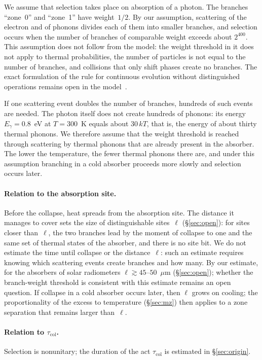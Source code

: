 \documentclass[11pt,a4paper]{article}
\newcommand{\Sref}[1]{\hyperref[#1]{\S\ref{#1}}}
\begin{document}
We assume that selection takes place on absorption of a photon. The branches ``zone~0'' and ``zone~1'' have weight~$1/2$. By our assumption, scattering of the electron and of phonons divides each of them into smaller branches, and selection occurs when the number of branches of comparable weight exceeds about $2^{400}$. This assumption does not follow from the model: the weight threshold in it does not apply to thermal probabilities, the number of particles is not equal to the number of branches, and collisions that only shift phases create no branches. The exact formulation of the rule for continuous evolution without distinguished operations remains open in the model~\cite{ponfilenok2026threshold}.

If one scattering event doubles the number of branches, hundreds of such events are needed. The photon itself does not create hundreds of phonons: its energy $E_\gamma=0.8$~eV at $T=300$~K equals about $30\,kT$, that is, the energy of about thirty thermal phonons. We therefore assume that the weight threshold is reached through scattering by thermal phonons that are already present in the absorber. The lower the temperature, the fewer thermal phonons there are, and under this assumption branching in a cold absorber proceeds more slowly and selection occurs later.

\paragraph{Relation to the absorption site.}
Before the collapse, heat spreads from the absorption site. The distance it manages to cover sets the size of distinguishable sites~$\ell$ (\Sref{sec:open}): for sites closer than~$\ell$, the two branches lead by the moment of collapse to one and the same set of thermal states of the absorber, and there is no site bit. We do not estimate the time until collapse or the distance~$\ell$: such an estimate requires knowing which scattering events create branches and how many. By our estimate, for the absorbers of solar radiometers $\ell\gtrsim 45$--$50$~$\mu$m (\Sref{sec:open}); whether the branch-weight threshold is consistent with this estimate remains an open question. If collapse in a cold absorber occurs later, then $\ell$ grows on cooling; the proportionality of the excess to temperature (\Sref{sec:mz}) then applies to a zone separation that remains larger than~$\ell$.

\paragraph{Relation to $\tau_{\mathrm{col}}$.}
Selection is nonunitary; the duration of the act $\tau_{\mathrm{col}}$ is estimated in \Sref{sec:origin}.
\end{document}
